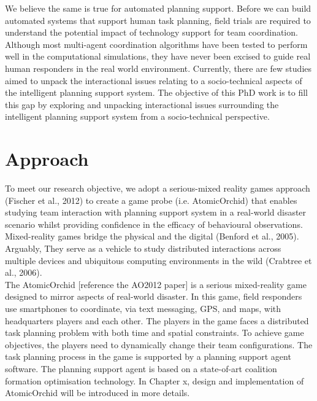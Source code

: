 We believe the same is true for automated planning support. Before we can build automated systems that support human task planning, field trials are required to understand the potential impact of technology support for team coordination. Although most multi-agent coordination algorithms have been tested to perform well in the computational simulations, they have never been excised to guide real human responders in the real world environment. Currently, there are few studies aimed to unpack the interactional issues relating to a socio-technical aspects of the intelligent planning support system. The objective of this PhD work is to fill this gap by exploring and unpacking interactional issues surrounding the intelligent planning support system from a socio-technical perspective.\\

\section{Approach}\label{sec:custom}

To meet our research objective, we adopt a serious-mixed reality games approach (Fischer et al., 2012) to create a game probe (i.e. AtomicOrchid) that enables studying team interaction with planning support system in a real-world disaster scenario whilst providing confidence in the efficacy of behavioural observations. Mixed-reality games bridge the physical and the digital (Benford et al., 2005). Arguably, They serve as a vehicle to study distributed interactions across multiple devices and ubiquitous computing environments in the wild (Crabtree et al., 2006).\\

The AtomicOrchid [reference the AO2012 paper] is a serious mixed-reality game designed to mirror aspects of real-world disaster. In this game, field responders use smartphones to coordinate, via text messaging, GPS, and maps, with headquarters players and each other. The players in the game faces a distributed task planning problem with both time and spatial constraints. To achieve game objectives, the players need to dynamically change their team configurations. The task planning process in the game is supported by a planning support agent software. The planning support agent is based on a state-of-art coalition formation optimisation technology.  In Chapter x, design and implementation of AtomicOrchid will be introduced in more details.\\

